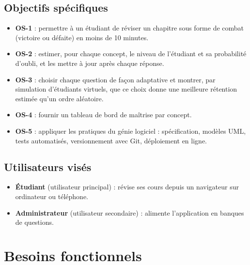 \documentclass[11pt,a4paper]{article}
\begin{document}
\subsection{Objectifs sp\'ecifiques}
\begin{itemize}
  \item \textbf{OS-1} : permettre \`a un \'etudiant de r\'eviser un chapitre sous forme de combat (victoire ou d\'efaite) en moins de 10 minutes.
  \item \textbf{OS-2} : estimer, pour chaque concept, le niveau de l'\'etudiant et sa probabilit\'e d'oubli, et les mettre \`a jour apr\`es chaque r\'eponse.
  \item \textbf{OS-3} : choisir chaque question de fa\c{c}on adaptative et montrer, par simulation d'\'etudiants virtuels, que ce choix donne une meilleure r\'etention estim\'ee qu'un ordre al\'eatoire.
  \item \textbf{OS-4} : fournir un tableau de bord de ma\^itrise par concept.
  \item \textbf{OS-5} : appliquer les pratiques du g\'enie logiciel : sp\'ecification, mod\`eles UML, tests automatis\'es, versionnement avec Git, d\'eploiement en ligne.
\end{itemize}

\subsection{Utilisateurs vis\'es}
\begin{itemize}
  \item \textbf{\'Etudiant} (utilisateur principal) : r\'evise ses cours depuis un navigateur sur ordinateur ou t\'el\'ephone.
  \item \textbf{Administrateur} (utilisateur secondaire) : alimente l'application en banques de questions.
\end{itemize}

\section{Besoins fonctionnels}
\end{document}
